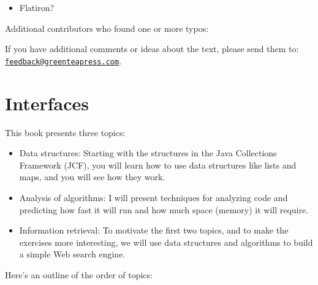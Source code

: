 \documentclass[12pt]{book}
\theoremstyle{exercise}
\begin{document}
\begin{itemize}

\item Flatiron?



\end{itemize}


Additional contributors who found one or more typos: 

If you have additional comments or ideas about the text, please send them to: \href{mailto:feedback@greenteapress.com}{\tt feedback@greenteapress.com}.


\mainmatter

\chapter{Interfaces}
\label{cs-lists-programming-to-an-interface-readme}

This book presents three topics:

\begin{itemize}

\item Data structures: Starting with the structures in the Java
Collections Framework (JCF), you will learn how to use data structures
like lists and maps, and you will see how they work.

\item Analysis of algorithms: I will present techniques for analyzing
code and predicting how fast it will run and how much space (memory) it
will require.

\item Information retrieval: To motivate the first two topics, and to
make the exercises more interesting, we will use data structures and
algorithms to build a simple Web search engine.

\end{itemize}

Here's an outline of the order of topics:
\end{document}
